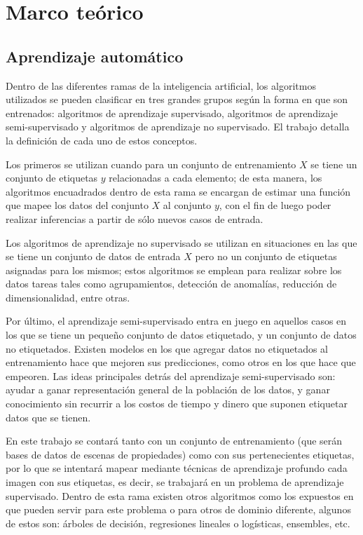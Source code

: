 \section{Marco teórico}\label{sec:marco_teorico}
\subsection{Aprendizaje automático}
 Dentro de las diferentes ramas de la inteligencia artificial, los algoritmos utilizados se pueden clasificar en tres grandes grupos según la forma en que son entrenados: algoritmos de aprendizaje supervisado, algoritmos de aprendizaje semi-supervisado y algoritmos de aprendizaje no supervisado. El trabajo \cite{zhu2009introduction} detalla la definición de cada uno de estos conceptos.
 
  Los primeros se utilizan cuando para un conjunto de entrenamiento \(X\) se tiene un conjunto de etiquetas \(y\) relacionadas a cada elemento; de esta manera, los algoritmos encuadrados dentro de esta rama se encargan de estimar una función que mapee los datos del conjunto \(X\) al conjunto \(y\), con el fin de luego poder realizar inferencias a partir de sólo nuevos casos de entrada.
 
  Los algoritmos de aprendizaje no supervisado se utilizan en situaciones en las que se tiene un conjunto de datos de entrada \(X\) pero no un conjunto de etiquetas asignadas para los mismos; estos algoritmos se emplean para realizar sobre los datos tareas tales como agrupamientos, detección de anomalías, reducción de dimensionalidad, entre otras.
  
  Por último, el aprendizaje semi-supervisado entra en juego en aquellos casos en los que se tiene un pequeño conjunto de datos etiquetado, y un conjunto de datos no etiquetados. Existen modelos en los que agregar datos no etiquetados al entrenamiento hace que mejoren sus predicciones, como otros en los que hace que empeoren. Las ideas principales detrás del aprendizaje semi-supervisado son: ayudar a ganar representación general de la población de los datos, y ganar conocimiento sin recurrir a los costos de tiempo y dinero que suponen etiquetar datos que se tienen.
 
 En este trabajo se contará tanto con un conjunto de entrenamiento (que serán bases de datos de escenas de propiedades) como con sus pertenecientes etiquetas, por lo que se intentará mapear mediante técnicas de aprendizaje profundo cada imagen con sus etiquetas, es decir, se trabajará en un problema de aprendizaje supervisado. Dentro de esta rama existen otros algoritmos como los expuestos en \cite{scikit-learn} que pueden servir para este problema o para otros de dominio diferente, algunos de estos son: árboles de decisión, regresiones lineales o logísticas, ensembles, etc.
 

